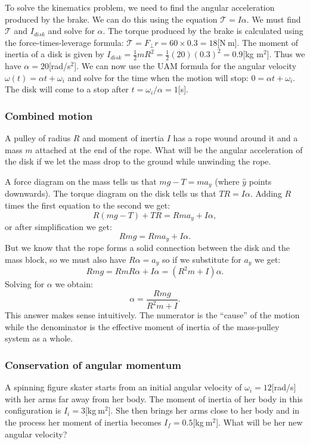\documentclass[letterpaper,9pt,journal]{IEEEtran}
\begin{document}
To solve the kinematics problem, we need to find the angular acceleration
produced by the brake. We can do this using the equation $\mathcal{T}=I\alpha$.
We must find $\mathcal{T}$ and $I_{disk}$ and solve for $\alpha$.
The torque produced by the brake is calculated using the force-times-leverage 
formula: $\mathcal{T}=F_{\perp}r= 60\times 0.3=18$[N$\:$m].
The moment of inertia of a disk is given by 
$I_{disk} = \frac{1}{2}mR^2=\frac{1}{2}(20)(0.3)^2=0.9$[kg m$^2$].
Thus we have $\alpha=20$[rad/s$^2$].
We can now use the UAM formula for the angular velocity 
$\omega(t) = \alpha t + \omega_i$ and solve for the time
when the motion will stop: $0 = \alpha t + \omega_i$.
The disk will come to a stop after $t=\omega_i/\alpha = 1$[s].


\subsubsection{Combined motion}

A pulley of radius $R$ and moment of inertia $I$ has a rope wound around it
and a mass $m$ attached at the end of the rope.
What will be the angular acceleration of the disk if we let the mass 
drop to the ground while unwinding the rope.

A force diagram on the mass tells us that $mg-T=ma_y$ (where $\hat{y}$ points downwards).
The torque diagram on the disk tells us that $TR = I \alpha$.
Adding $R$ times the first equation to the second we get:
\[
 R({mg - T}) + T  R  = R m a_y + I \alpha,
\]
or after simplification we get:
\[
 R  m  g = R m a_y + I \alpha.
\]
But we know that the rope forms a solid connection between the disk and the mass block,
so we must also have $R \alpha = a_y$ so if we substitute for $a_y$ we get:
\[
 R  m  g = R m R \alpha + I \alpha = (R^2 m + I) \alpha.
\]
Solving for $\alpha$ we obtain:
\[
 \alpha = \frac{  R  m  g  }{ R^2 m + I }.
\]
This answer makes sense intuitively.
The numerator is the ``cause'' of the motion while 
the denominator is the effective moment of inertia of the mass-pulley system as a whole.


\subsubsection{Conservation of angular momentum}

A spinning figure skater starts from an initial angular velocity of $\omega_i=12$[rad/s]
with her arms far away from her body. 
The moment of inertia of her body in this configuration is $I_i=3$[kg$\:$m$^2$]. 
She then brings her arms close to her body and in the process her moment 
of inertia becomes $I_f=0.5$[kg$\:$m$^2$]. What will be her new angular velocity?
\end{document}
